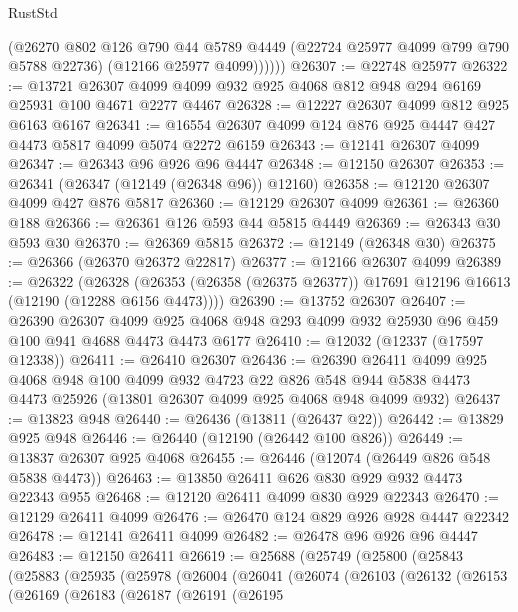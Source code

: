 \begin{lexlean}{RustStd}
\begin{coremodule}
            (@26270
              @802
              @126
              @790
              @44
              @5789
              @4449
              (@22724 @25977 @4099 @799 @790 @5788 @22736)
              (@12166 @25977 @4099))))))
@26307 := @22748 @25977
@26322 := @13721
    @26307
    @4099
    @4099
    @932
    @925
    @4068
    @812
    @948
    @294
    @6169
    @25931
    @100
    @4671
    @2277
    @4467
@26328 := @12227 @26307 @4099 @812 @925 @6163 @6167
@26341 := @16554 @26307 @4099 @124 @876 @925 @4447 @427 @4473 @5817 @4099 @5074 @2272 @6159
@26343 := @12141 @26307 @4099
@26347 := @26343 @96 @926 @96 @4447
@26348 := @12150 @26307
@26353 := @26341 (@26347 (@12149 (@26348 @96)) @12160)
@26358 := @12120 @26307 @4099 @427 @876 @5817
@26360 := @12129 @26307 @4099
@26361 := @26360 @188
@26366 := @26361 @126 @593 @44 @5815 @4449
@26369 := @26343 @30 @593 @30
@26370 := @26369 @5815
@26372 := @12149 (@26348 @30)
@26375 := @26366 (@26370 @26372 @22817)
@26377 := @12166 @26307 @4099
@26389 := @26322
    (@26328 (@26353 (@26358 (@26375 @26377)) @17691 @12196 @16613 (@12190 (@12288 @6156 @4473))))
@26390 := @13752 @26307
@26407 := @26390
    @26307
    @4099
    @925
    @4068
    @948
    @293
    @4099
    @932
    @25930
    @96
    @459
    @100
    @941
    @4688
    @4473
    @4473
    @6177
@26410 := @12032 (@12337 (@17597 @12338))
@26411 := @26410 @26307
@26436 := @26390
    @26411
    @4099
    @925
    @4068
    @948
    @100
    @4099
    @932
    @4723
    @22
    @826
    @548
    @944
    @5838
    @4473
    @4473
    @25926
    (@13801 @26307 @4099 @925 @4068 @948 @4099 @932)
@26437 := @13823 @948
@26440 := @26436 (@13811 (@26437 @22))
@26442 := @13829 @925 @948
@26446 := @26440 (@12190 (@26442 @100 @826))
@26449 := @13837 @26307 @925 @4068
@26455 := @26446 (@12074 (@26449 @826 @548 @5838 @4473))
@26463 := @13850 @26411 @626 @830 @929 @932 @4473 @22343 @955
@26468 := @12120 @26411 @4099 @830 @929 @22343
@26470 := @12129 @26411 @4099
@26476 := @26470 @124 @829 @926 @928 @4447 @22342
@26478 := @12141 @26411 @4099
@26482 := @26478 @96 @926 @96 @4447
@26483 := @12150 @26411
@26619 := @25688
    (@25749
      (@25800
        (@25843
          (@25883
            (@25935
              (@25978
                (@26004
                  (@26041
                    (@26074
                      (@26103
                        (@26132
                          (@26153
                            (@26169
                              (@26183
                                (@26187
                                  (@26191
                                    (@26195

\end{coremodule}
\end{lexlean}
